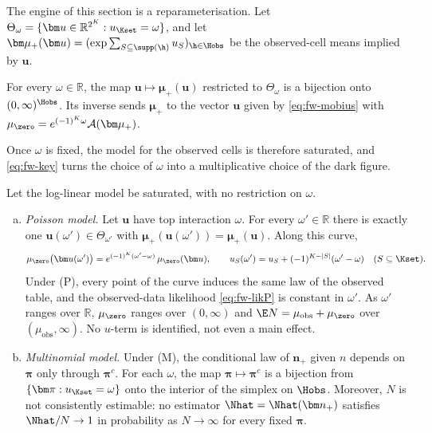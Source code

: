 The engine of this section is a reparameterisation. Let $\Theta_\omega=\{\bm u\in\mathbb R^{2^K}:u_{\Kset}=\omega\}$, and let $\bm\mu_+(\bm u)=(\exp\sum_{S\subseteq\supp(\h)}u_S)_{\h\in\Hobs}$ be the observed-cell means implied by $\bm u$.

\begin{lemma}\label{lem:id-param}
For every $\omega\in\mathbb R$, the map $\bm u\mapsto\bm\mu_+(\bm u)$ restricted to $\Theta_\omega$ is a bijection onto $(0,\infty)^{\Hobs}$. Its inverse sends $\bm\mu_+$ to the vector $\bm u$ given by \eqref{eq:fw-mobius} with $\mu_{\zero}=e^{(-1)^K\omega}\mathcal A(\bm\mu_+)$.
\end{lemma}

Once $\omega$ is fixed, the model for the observed cells is therefore saturated, and \eqref{eq:fw-key} turns the choice of $\omega$ into a multiplicative choice of the dark figure.

\begin{theorem}\label{thm:nonid}
Let the log-linear model be saturated, with no restriction on $\omega$.
\begin{enumerate}[(a)]
  \item \emph{Poisson model.} Let $\bm u$ have top interaction $\omega$. For every $\omega'\in\mathbb R$ there is exactly one $\bm u(\omega')\in\Theta_{\omega'}$ with $\bm\mu_+(\bm u(\omega'))=\bm\mu_+(\bm u)$. Along this curve,
  \begin{equation}\label{eq:id-curve}
    \mu_{\zero}\bigl(\bm u(\omega')\bigr)=e^{(-1)^K(\omega'-\omega)}\,\mu_{\zero}(\bm u),
    \qquad
    u_S(\omega')=u_S+(-1)^{K-|S|}(\omega'-\omega)\quad(S\subseteq\Kset).
  \end{equation}
  Under (P), every point of the curve induces the same law of the observed table, and the observed-data likelihood \eqref{eq:fw-likP} is constant in $\omega'$. As $\omega'$ ranges over $\mathbb R$, $\mu_{\zero}$ ranges over $(0,\infty)$ and $\E N=\mu_{\mathrm{obs}}+\mu_{\zero}$ over $(\mu_{\mathrm{obs}},\infty)$. No $u$-term is identified, not even a main effect.
  \item \emph{Multinomial model.} Under (M), the conditional law of $\bm n_+$ given $n$ depends on $\bm\pi$ only through $\bm\pi^c$. For each $\omega$, the map $\bm\pi\mapsto\bm\pi^c$ is a bijection from $\{\bm\pi:u_{\Kset}=\omega\}$ onto the interior of the simplex on $\Hobs$. Moreover, $N$ is not consistently estimable: no estimator $\Nhat=\Nhat(\bm n_+)$ satisfies $\Nhat/N\to1$ in probability as $N\to\infty$ for every fixed $\bm\pi$.
\end{enumerate}
\end{theorem}


